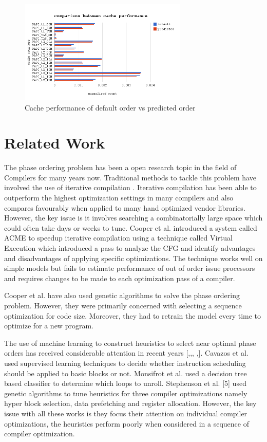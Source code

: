 \documentclass[10pt]{sigplanconf}
\begin{document}
\begin{figure}[ht!]
\centering
\includegraphics[width=80mm]{cache.png}
\caption{Cache performance of default order vs predicted order}
\label{overflow}
\end{figure}


\section{Related Work}

The phase ordering problem has been a open research topic in the field of Compilers for many years now. Traditional methods to tackle this problem have involved the use of iterative compilation \cite{c9} . Iterative compilation has been able to outperform the highest optimization settings in many compilers and also compares favourably when applied to many hand optimized vendor libraries. However, the key issue is it involves searching a combinatorially large space which could often take days or weeks to tune. Cooper et al. \cite{c9}  introduced a system called ACME to speedup iterative compilation using a technique called Virtual Execution which introduced a pass to analyze the CFG and identify advantages and disadvantages of applying specific optimizations. The technique works well on simple models but fails to estimate performance of out of order issue processors and requires changes to be made to each optimization pass of a compiler. 

Cooper et al. \cite{c8}  have also used genetic algorithms to solve the phase ordering problem. However, they were primarily concerned with selecting a sequence optimization for code size. Moreover, they had to retrain the model every time to optimize for a new program. 

The use of machine learning to construct heuristics to select near optimal phase orders has received considerable attention in recent years [\cite{c2},\cite{c3},\cite{c5}, \cite{c6},\cite{c7}]. Cavazos et al. \cite{c9}  used supervised learning techniques to decide whether instruction scheduling should be applied to basic blocks or not. Monsifrot et al. \cite{c3}  used a decision tree based classiﬁer to determine which loops to unroll. Stephenson et al. [5] used genetic algorithms to tune heuristics for three compiler optimizations namely hyper block selection, data prefetching and register allocation. However, the key issue with all these works is they focus their attention on individual compiler optimizations, the heuristics perform poorly when considered in a sequence of compiler optimization. 
\end{document}
